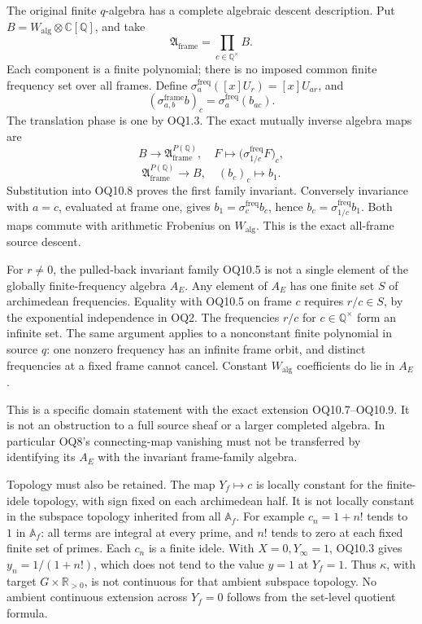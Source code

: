 The original finite \(q\)-algebra has a complete algebraic descent
description. Put \(B=W_{\mathrm{alg}}\otimes\mathbb C[\mathbb Q]\), and
take \[
\mathfrak A_{\mathrm{frame}}=\prod_{c\in\mathbb Q^\times}B.
\tag{OQ10.7}
\] Each component is a finite polynomial; there is no imposed common
finite frequency set over all frames. Define
\(\sigma_a^{\mathrm{freq}}([x]U_r)=[x]U_{ar}\), and \[
(\sigma^{\mathrm{frame}}_{a,b}b)_c
=\sigma_a^{\mathrm{freq}}(b_{ac}).
\tag{OQ10.8}
\] The translation phase is one by OQ1.3. The exact mutually inverse
algebra maps are \[
B\longrightarrow\mathfrak A_{\mathrm{frame}}^{P(\mathbb Q)},
\quad F\longmapsto
\bigl(\sigma_{1/c}^{\mathrm{freq}}F\bigr)_c,
\] \[
\mathfrak A_{\mathrm{frame}}^{P(\mathbb Q)}
\longrightarrow B,\quad (b_c)_c\longmapsto b_1.
\tag{OQ10.9}
\] Substitution into OQ10.8 proves the first family invariant.
Conversely invariance with \(a=c\), evaluated at frame one, gives
\(b_1=\sigma_c^{\mathrm{freq}}b_c\), hence
\(b_c=\sigma_{1/c}^{\mathrm{freq}}b_1\). Both maps commute with
arithmetic Frobenius on \(W_{\mathrm{alg}}\). This is the exact
all-frame source descent.

For \(r\ne0\), the pulled-back invariant family OQ10.5 is not a single
element of the globally finite-frequency algebra \(A_E\). Any element of
\(A_E\) has one finite set \(S\) of archimedean frequencies. Equality
with OQ10.5 on frame \(c\) requires \(r/c\in S\), by the exponential
independence in OQ2. The frequencies \(r/c\) for
\(c\in\mathbb Q^\times\) form an infinite set. The same argument applies
to a nonconstant finite polynomial in source \(q\): one nonzero
frequency has an infinite frame orbit, and distinct frequencies at a
fixed frame cannot cancel. Constant \(W_{\mathrm{alg}}\) coefficients do
lie in \(A_E\).

This is a specific domain statement with the exact extension
OQ10.7--OQ10.9. It is not an obstruction to a full source sheaf or a
larger completed algebra. In particular OQ8's connecting-map vanishing
must not be transferred by identifying its \(A_E\) with the invariant
frame-family algebra.

Topology must also be retained. The map \(Y_f\mapsto c\) is locally
constant for the finite-idele topology, with sign fixed on each
archimedean half. It is not locally constant in the subspace topology
inherited from all \(\mathbb A_f\). For example \(c_n=1+n!\) tends to
\(1\) in \(\mathbb A_f\): all terms are integral at every prime, and
\(n!\) tends to zero at each fixed finite set of primes. Each \(c_n\) is
a finite idele. With \(X=0,Y_\infty=1\), OQ10.3 gives \(y_n=1/(1+n!)\),
which does not tend to the value \(y=1\) at \(Y_f=1\). Thus \(\kappa\),
with target \(G\times\mathbb R_{>0}\), is not continuous for that
ambient subspace topology. No ambient continuous extension across
\(Y_f=0\) follows from the set-level quotient formula.

